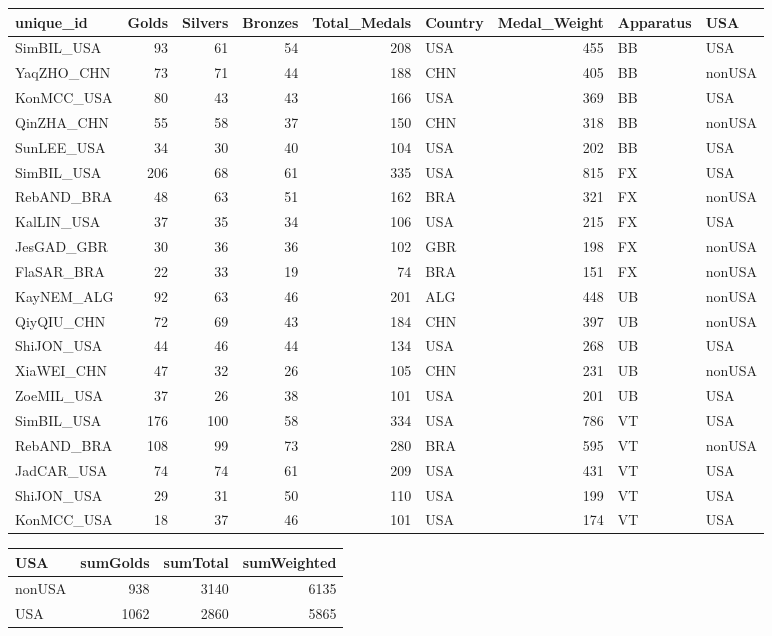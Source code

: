 \documentclass[
  letterpaper,
  DIV=11,
  numbers=noendperiod]{scrartcl}
\begin{document}
\begin{tabular}{l|r|r|r|r|l|r|l|l}
\hline
unique\_id & Golds & Silvers & Bronzes & Total\_Medals & Country & Medal\_Weight & Apparatus & USA\\
\hline
SimBIL\_USA & 93 & 61 & 54 & 208 & USA & 455 & BB & USA\\
\hline
YaqZHO\_CHN & 73 & 71 & 44 & 188 & CHN & 405 & BB & nonUSA\\
\hline
KonMCC\_USA & 80 & 43 & 43 & 166 & USA & 369 & BB & USA\\
\hline
QinZHA\_CHN & 55 & 58 & 37 & 150 & CHN & 318 & BB & nonUSA\\
\hline
SunLEE\_USA & 34 & 30 & 40 & 104 & USA & 202 & BB & USA\\
\hline
SimBIL\_USA & 206 & 68 & 61 & 335 & USA & 815 & FX & USA\\
\hline
RebAND\_BRA & 48 & 63 & 51 & 162 & BRA & 321 & FX & nonUSA\\
\hline
KalLIN\_USA & 37 & 35 & 34 & 106 & USA & 215 & FX & USA\\
\hline
JesGAD\_GBR & 30 & 36 & 36 & 102 & GBR & 198 & FX & nonUSA\\
\hline
FlaSAR\_BRA & 22 & 33 & 19 & 74 & BRA & 151 & FX & nonUSA\\
\hline
KayNEM\_ALG & 92 & 63 & 46 & 201 & ALG & 448 & UB & nonUSA\\
\hline
QiyQIU\_CHN & 72 & 69 & 43 & 184 & CHN & 397 & UB & nonUSA\\
\hline
ShiJON\_USA & 44 & 46 & 44 & 134 & USA & 268 & UB & USA\\
\hline
XiaWEI\_CHN & 47 & 32 & 26 & 105 & CHN & 231 & UB & nonUSA\\
\hline
ZoeMIL\_USA & 37 & 26 & 38 & 101 & USA & 201 & UB & USA\\
\hline
SimBIL\_USA & 176 & 100 & 58 & 334 & USA & 786 & VT & USA\\
\hline
RebAND\_BRA & 108 & 99 & 73 & 280 & BRA & 595 & VT & nonUSA\\
\hline
JadCAR\_USA & 74 & 74 & 61 & 209 & USA & 431 & VT & USA\\
\hline
ShiJON\_USA & 29 & 31 & 50 & 110 & USA & 199 & VT & USA\\
\hline
KonMCC\_USA & 18 & 37 & 46 & 101 & USA & 174 & VT & USA\\
\hline
\end{tabular}

\begin{tabular}{l|r|r|r}
\hline
USA & sumGolds & sumTotal & sumWeighted\\
\hline
nonUSA & 938 & 3140 & 6135\\
\hline
USA & 1062 & 2860 & 5865\\
\hline
\end{tabular}
\end{document}
